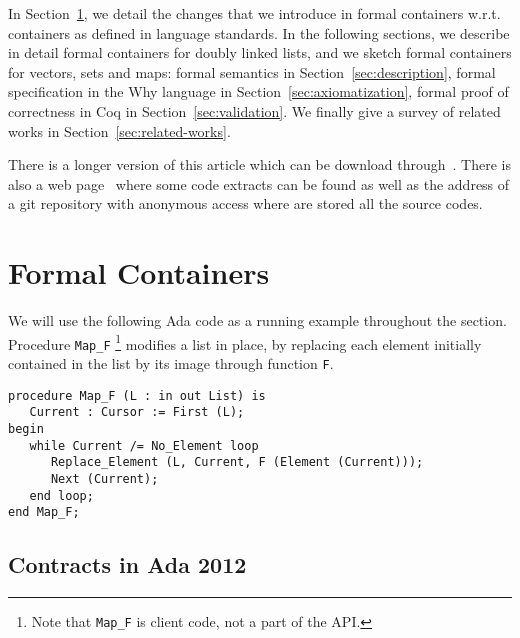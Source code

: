 \documentclass[runningheads,a4paper]{llncs}
\newcommand{\wrt}{w.r.t.\xspace}
\newcommand{\beforesec}{\vspace{-0.2cm}}
\newcommand{\aftersec}{\vspace{-0.2cm}}
\newcommand{\beforesub}{\vspace{-0.2cm}}
\newcommand{\aftersub}{\vspace{-0.1cm}}
\begin{document}
In Section~\ref{sec:formal-containers}, we detail the changes that we introduce
in formal containers \wrt containers as defined in language standards. In the following
sections, we describe in detail formal containers for doubly linked lists, and
we sketch formal containers for vectors, sets and maps: formal semantics in
Section~\ref{sec:description}, formal specification in the Why language in
Section~\ref{sec:axiomatization}, formal proof of correctness in Coq in
Section~\ref{sec:validation}. We finally give a survey of related works in
Section~\ref{sec:related-works}.

There is a longer version of this article which can be download through~\cite{dross:2011:fc-long}.
There is also a web page~\cite{dross:2011:fc-code} where some code extracts can be found as
well as the address of a git repository with anonymous access where are stored all the source codes.


\beforesec
\section{Formal Containers}
\label{sec:formal-containers}
\aftersec

We will use the following Ada code as a running example throughout the
section. Procedure \verb|Map_F|
\footnote{Note that \texttt{Map\_F} is client code, not a part of the API.}
%
modifies a list in place, by replacing each
element initially contained in the list by its image through function \verb|F|.
\lstset{language=Ada, basicstyle=\small\tt, keywordstyle=\normalfont\textbf}
\begin{lstlisting}
procedure Map_F (L : in out List) is
   Current : Cursor := First (L);
begin
   while Current /= No_Element loop
      Replace_Element (L, Current, F (Element (Current)));
      Next (Current);
   end loop;
end Map_F;
\end{lstlisting}

\beforesub
\subsection{Contracts in Ada 2012}
\aftersub
\end{document}
